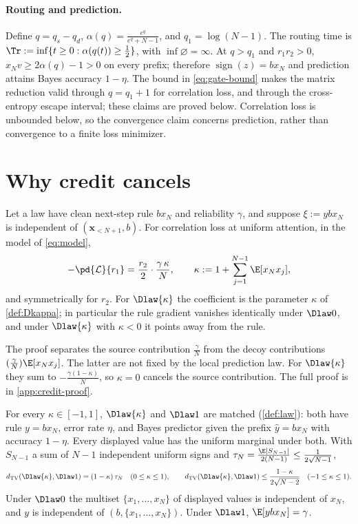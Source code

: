 \paragraph{Routing and prediction.}
Define $q=q_s-q_d$, $\alpha(q)=\tfrac{e^q}{e^q+N-1}$, and $q_1=\log(N-1)$.
The routing time is $\Tr:=\inf\{t\ge0:\alpha(q(t))\ge\tfrac{1}{2}\}$, with $\inf\varnothing=\infty$.
At $q>q_1$ and $r_1r_2>0$, $x_N v\ge2\alpha(q)-1>0$ on every prefix;
therefore $\operatorname{sign}(z)=b x_N$ and prediction attains Bayes accuracy $1-\eta$.
The bound in \cref{eq:gate-bound} makes the matrix reduction valid through $q=q_1+1$ for correlation loss,
and through the cross-entropy escape interval; these claims are proved below.
Correlation loss is unbounded below, so the convergence claim concerns prediction, rather than convergence to a finite loss minimizer.

\section{Why credit cancels}
\label{sec:cancel}

\begin{lemma}
\label{lem:credit}
Let a law have clean next-step rule $b x_N$ and reliability $\gamma$, and suppose $\xi:=y b x_N$ is independent of $(\bm x_{<N+1},b)$. For correlation loss at uniform attention, in the model of \cref{eq:model},
\[
 -\pd{\mathcal L}{r_1}=\frac{r_2}{2}\cdot\frac{\gamma\,\kappa}{N},
 \qquad
 \kappa:=1+\sum_{j=1}^{N-1}\E[x_N x_j],
\]
and symmetrically for $r_2$. For $\Dlaw{\kappa}$ the coefficient is the parameter $\kappa$ of \cref{def:Dkappa}; in particular the rule gradient vanishes identically
under $\Dlaw0$, and under $\Dlaw{\kappa}$ with $\kappa<0$ it points away from the rule.
\end{lemma}

The proof separates the source contribution $\tfrac{\gamma}{N}$ from the decoy contributions
$(\tfrac{\gamma}{N})\E[x_N x_j]$. The latter are not fixed by the local prediction law.
For $\Dlaw{\kappa}$ they sum to $-\tfrac{\gamma(1-\kappa)}{N}$, so $\kappa=0$ cancels the source contribution.
The full proof is in \cref{app:credit-proof}.

\begin{lemma}
\label{lem:matched}
For every $\kappa\in[-1,1]$, $\Dlaw{\kappa}$ and $\Dlaw1$ are matched (\cref{def:law}): both have rule $y=b x_N$, error rate $\eta$,
and Bayes predictor given the prefix $\hat y=b x_N$ with accuracy $1-\eta$. Every displayed value has the uniform marginal under both.
With $S_{N-1}$ a sum of $N-1$ independent uniform signs and $\tau_N=\tfrac{\E|S_{N-1}|}{2(N-1)}\le\tfrac{1}{2\sqrt{N-1}}$,
\[
 d_{\mathrm{TV}}(\Dlaw{\kappa},\Dlaw1)=(1-\kappa)\,\tau_N\quad(0\le\kappa\le1),\qquad
 d_{\mathrm{TV}}(\Dlaw{\kappa},\Dlaw1)\le\frac{1-\kappa}{2\sqrt{N-2}}\quad(-1\le\kappa\le1).
\]
Under $\Dlaw0$ the multiset $\{x_1,\ldots,x_N\}$ of displayed values is independent of $x_N$, and $y$ is independent of
$(b,\{x_1,\ldots,x_N\})$. Under $\Dlaw1$, $\E[y b x_N]=\gamma$.
\end{lemma}

